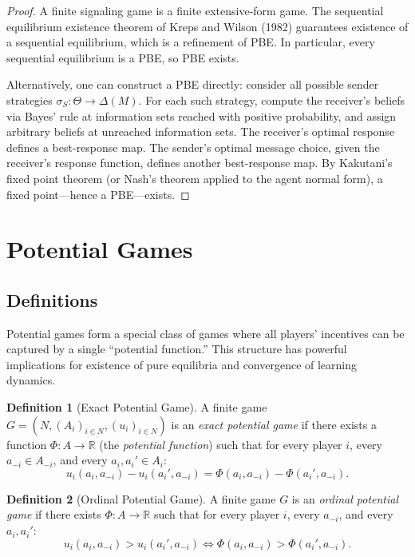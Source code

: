 \documentclass[11pt,a4paper]{article}
\theoremstyle{definition}
\newtheorem{definition}{Definition}[section]
\theoremstyle{plain}
\theoremstyle{remark}
\newcommand{\R}{\mathbb{R}}
\begin{document}
\begin{proof}
A finite signaling game is a finite extensive-form game. The sequential equilibrium
existence theorem of Kreps and Wilson (1982) guarantees existence of a sequential
equilibrium, which is a refinement of PBE. In particular, every sequential equilibrium
is a PBE, so PBE exists.

Alternatively, one can construct a PBE directly: consider all possible sender strategies
$\sigma_S : \Theta \to \Delta(M)$. For each such strategy, compute the receiver's
beliefs via Bayes' rule at information sets reached with positive probability, and assign
arbitrary beliefs at unreached information sets. The receiver's optimal response defines
a best-response map. The sender's optimal message choice, given the receiver's response
function, defines another best-response map. By Kakutani's fixed point theorem (or Nash's
theorem applied to the agent normal form), a fixed point---hence a PBE---exists.
\end{proof}


\section{Potential Games}
\label{sec:potential-games}

\subsection{Definitions}

Potential games form a special class of games where all players' incentives can be captured
by a single ``potential function.'' This structure has powerful implications for existence
of pure equilibria and convergence of learning dynamics.

\begin{definition}[Exact Potential Game]
\label{def:exact-potential}
A finite game $G = (N, (A_i)_{i \in N}, (u_i)_{i \in N})$ is an \emph{exact potential
game} if there exists a function $\Phi : A \to \R$ (the \emph{potential function}) such
that for every player $i$, every $a_{-i} \in A_{-i}$, and every $a_i, a_i' \in A_i$:
\[
    u_i(a_i, a_{-i}) - u_i(a_i', a_{-i}) = \Phi(a_i, a_{-i}) - \Phi(a_i', a_{-i}).
\]
\end{definition}

\begin{definition}[Ordinal Potential Game]
\label{def:ordinal-potential}
A finite game $G$ is an \emph{ordinal potential game} if there exists $\Phi : A \to \R$
such that for every player $i$, every $a_{-i}$, and every $a_i, a_i'$:
\[
    u_i(a_i, a_{-i}) > u_i(a_i', a_{-i}) \iff \Phi(a_i, a_{-i}) > \Phi(a_i', a_{-i}).
\]
\end{definition}
\end{document}

